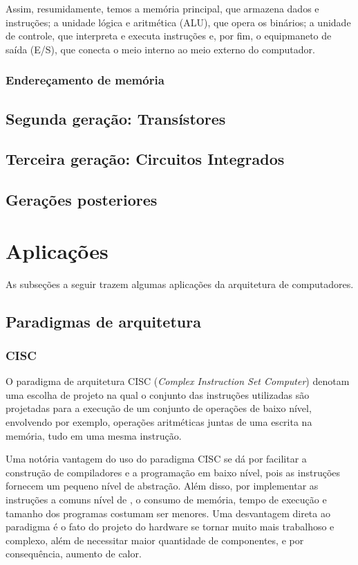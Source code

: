 \documentclass{article}
\begin{document}
Assim, resumidamente, temos a memória principal, que armazena dados e
instruções; a unidade lógica e aritmética (ALU), que opera os binários; a
unidade de controle, que interpreta e executa instruções e, por fim, o
equipmaneto de saída (E/S), que conecta o meio interno ao meio externo do
computador.

\subsubsection{Endereçamento de memória}

\subsection{Segunda geração: Transístores}
\subsection{Terceira geração: Circuitos Integrados}
\subsection{Gerações posteriores}

\section{Aplicações} 
As subseções a seguir trazem algumas aplicações da arquitetura de computadores.
\subsection{Paradigmas de arquitetura}

\subsubsection{CISC}
O paradigma de arquitetura CISC (\textit{Complex Instruction Set
  Computer}) denotam uma escolha de projeto na qual o conjunto das
instruções utilizadas são projetadas para a execução de um conjunto de
operações de baixo nível, envolvendo por exemplo, operações
aritméticas juntas de uma escrita na memória, tudo em uma mesma
instrução.

Uma notória vantagem do uso do paradigma CISC se dá por facilitar a construção
de compiladores e a programação em baixo nível, pois as instruções fornecem um
pequeno nível de abstração. Além disso, por implementar as instruções a comuns
nível de , o consumo de memória, tempo de execução e tamanho
dos programas costumam ser menores. Uma desvantagem direta ao paradigma é o
fato do projeto do hardware se tornar muito mais trabalhoso e complexo, além de
necessitar maior quantidade de componentes, e por consequência, aumento de
calor.
\end{document}
